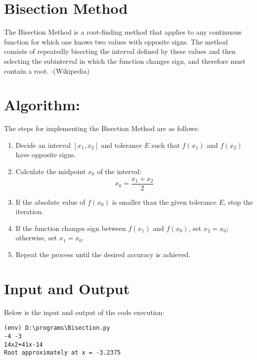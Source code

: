 \documentclass[12pt]{article}
\begin{document}
\tableofcontents
\newpage
\section*{Bisection Method}

The Bisection Method is a root-finding method that applies to any continuous function for which one knows two values with opposite signs. The method consists of repeatedly bisecting the interval defined by these values and then selecting the subinterval in which the function changes sign, and therefore must contain a root. -(Wikipedia)
\section*{Algorithm:}
The steps for implementing the Bisection Method are as follows:

\begin{enumerate}
    \item Decide an interval \([x_1, x_2]\) and tolerance \(E\) such that \(f(x_1)\) and \(f(x_2)\) have opposite signs.
    \item Calculate the midpoint \(x_0\) of the interval:
    \[
    x_0 = \frac{x_1 + x_2}{2}
    \]
    \item If the absolute value of \(f(x_0)\) is smaller than the given tolerance \(E\), stop the iteration.
    \item If the function changes sign between \(f(x_1)\) and \(f(x_0)\), set \(x_2 = x_0\); otherwise, set \(x_1 = x_0\).
    \item Repeat the process until the desired accuracy is achieved.
\end{enumerate}
\section*{Input and Output}

\noindent Below is the input and output of the code execution:

{\small
\begin{verbatim}
(env) D:\programs\Bisection.py
-4 -3
14x2+41x-14
Root approximately at x = -3.2375
\end{verbatim}
}
\end{document}
